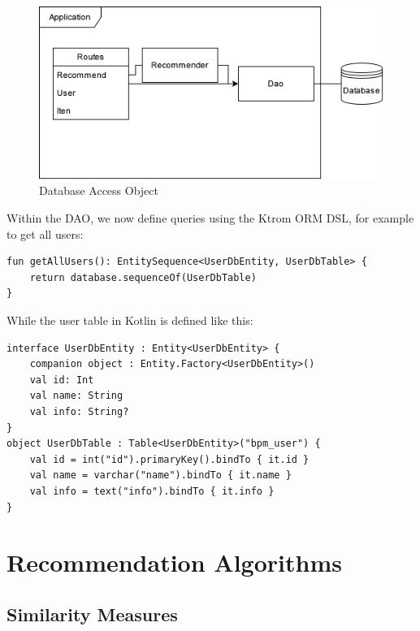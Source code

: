 \begin{figure}[h!]
\centering
\includegraphics[width=\textwidth]{images/dao_visualizer.png}
\caption{\label{fig:dao_vis}Database Access Object}
\end{figure}

\newpage

Within the DAO, we now define queries using the Ktrom ORM DSL, for example to get all users:

\begin{verbatim}
fun getAllUsers(): EntitySequence<UserDbEntity, UserDbTable> {
    return database.sequenceOf(UserDbTable)
}
\end{verbatim}

While the user table in Kotlin is defined like this:

\begin{verbatim}
interface UserDbEntity : Entity<UserDbEntity> {
    companion object : Entity.Factory<UserDbEntity>()
    val id: Int
    val name: String
    val info: String?
}
object UserDbTable : Table<UserDbEntity>("bpm_user") {
    val id = int("id").primaryKey().bindTo { it.id }
    val name = varchar("name").bindTo { it.name }
    val info = text("info").bindTo { it.info }
}
\end{verbatim}

\section{Recommendation Algorithms}

\label{sec:recommend_algo}

\subsection{Similarity Measures}

